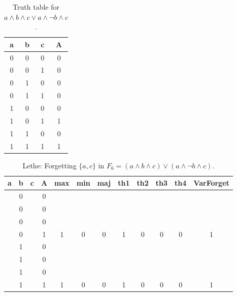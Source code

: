 \begin{table}[!tb]
    \centering
    \begin{tabular}{|c|c|c|c|}
        \hline
        \textbf{a} & \textbf{b} & \textbf{c} & \textbf{A} \\ \hline
        0 & 0 & 0 & 0 \\ \hline
        0 & 0 & 1 & 0 \\ \hline
        0 & 1 & 0 & 0 \\ \hline
        0 & 1 & 1 & 0 \\ \hline
        1 & 0 & 0 & 0 \\ \hline
        1 & 0 & 1 & 1 \\ \hline
        1 & 1 & 0 & 0 \\ \hline
        1 & 1 & 1 & 1 \\ \hline
    \end{tabular}
    \caption{Truth table for $a \land b \land c \lor a \land \lnot b \land c$.}
    \label{tab:truthtab}
\end{table}

\begin{table}[!tb]
    \centering
    \begin{tabular}{|c|c|c|c|c|c|c|c|c|c|c|c|}
        \hline
        \textbf{a} & \textbf{b} & \textbf{c} & \textbf{A} & \textbf{max} & \textbf{min} & \textbf{maj} & \textbf{th1} & \textbf{th2} & \textbf{th3} & \textbf{th4} & \textbf{VarForget} \\ \hline
        \rowcolor{gray!40}  & 0 &  & 0 &  &  &  &  &  &  &  &  \\ \hline
        \rowcolor{gray!40}  & 0 &  & 0 &  &  &  &  &  &  &  &  \\ \hline
        \rowcolor{gray!40}  & 0 &  & 0 &  &  &  &  &  &  &  &  \\ \hline
        \rowcolor{gray!40}  & 0 &  & 1 & 1 & 0 & 0 & 1 & 0 & 0 & 0 & 1 \\ \hline
        \rowcolor{blue!40}  & 1 &  & 0 &  &  &  &  &  &  &  &  \\ \hline
        \rowcolor{blue!40}  & 1 &  & 0 &  &  &  &  &  &  &  &  \\ \hline
        \rowcolor{blue!40}  & 1 &  & 0 &  &  &  &  &  &  &  &  \\ \hline
        \rowcolor{blue!40}  & 1 &  & 1 & 1 & 0 & 0 & 1 & 0 & 0 & 0 & 1 \\ \hline
    \end{tabular}
    \caption{Lethe: Forgetting $\{a, c\}$ in $F_{6} = (a \land b \land c) \lor (a \land \lnot b \land c)$.}
    \label{tab:lethe-F6-ac}
\end{table}
